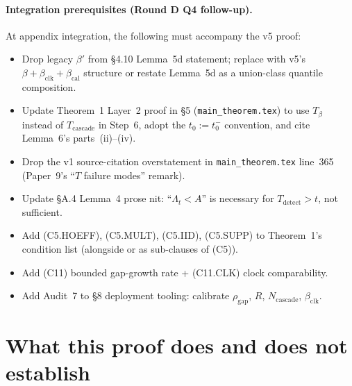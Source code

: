 \documentclass{article}
\newcommand{\rhogap}{\rho_{\mathrm{gap}}}
\newcommand{\Tbeta}{T_{\beta}}
\newcommand{\Ncasc}{N_{\mathrm{cascade}}}
\newcommand{\bclk}{\beta_{\mathrm{clk}}}
\newcommand{\bcal}{\beta_{\mathrm{cal}}}
\begin{document}
\paragraph{Integration prerequisites (Round D Q4 follow-up).}
At appendix integration, the following must accompany the v5 proof:
\begin{itemize}
\item Drop legacy $\beta'$ from §4.10 Lemma~5d statement;
  replace with v5's $\beta + \bclk + \bcal$ structure or restate
  Lemma~5d as a union-class quantile composition.
\item Update Theorem~1 Layer~2 proof in §5
  (\texttt{main\_theorem.tex}) to use $\Tbeta$ instead of
  $T_{\mathrm{cascade}}$ in Step~6, adopt the $t_0 := t_0^-$
  convention, and cite Lemma~6's parts~(ii)--(iv).
\item Drop the v1 source-citation overstatement in
  \texttt{main\_theorem.tex} line~365 (Paper~9's ``$T$ failure
  modes'' remark).
\item Update §A.4 Lemma~4 prose nit: ``$\Lambda_t < A$'' is
  necessary for $T_{\mathrm{detect}} > t$, not sufficient.
\item Add (C5.HOEFF), (C5.MULT), (C5.IID), (C5.SUPP) to
  Theorem~1's condition list (alongside or as sub-clauses of (C5)).
\item Add (C11) bounded gap-growth rate + (C11.CLK) clock
  comparability.
\item Add Audit~7 to §8 deployment tooling: calibrate $\rhogap$,
  $R$, $\Ncasc$, $\bclk$.
\end{itemize}

\section{What this proof does and does not establish}
\end{document}
